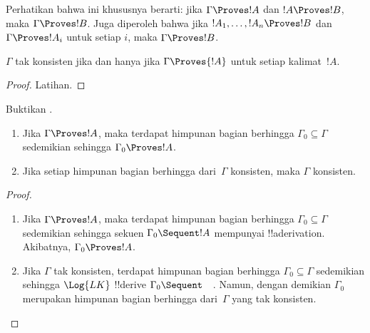 \documentclass[../../../include/open-logic-section]{subfiles}
\begin{document}
Perhatikan bahwa ini khususnya berarti: jika $\Gamma \Proves !A$ dan
$!A \Proves !B$, maka $\Gamma \Proves !B$. Juga diperoleh bahwa jika
$!A_1, \dots, !A_n \Proves !B$ dan $\Gamma \Proves !A_i$ untuk setiap
$i$, maka $\Gamma \Proves !B$.

\begin{prop}
$\Gamma$ tak konsisten jika dan hanya jika $\Gamma \Proves {!A}$ untuk
setiap kalimat~$!A$.
\end{prop}

\begin{proof}
Latihan.
\end{proof}

\begin{prob}
Buktikan .
\end{prob}

\begin{prop}[Kekompakan]
  \begin{enumerate}
  \item Jika $\Gamma \Proves !A$, maka terdapat himpunan bagian berhingga
    $\Gamma_0 \subseteq \Gamma$ sedemikian sehingga
    $\Gamma_0 \Proves !A$.
  \item Jika setiap himpunan bagian berhingga dari~$\Gamma$ konsisten, maka
    $\Gamma$ konsisten.
  \end{enumerate}
\end{prop}

\begin{proof}
  \begin{enumerate}
    \item Jika $\Gamma \Proves !A$, maka terdapat himpunan bagian berhingga
      $\Gamma_0 \subseteq \Gamma$ sedemikian sehingga sekuen
      $\Gamma_0 \Sequent !A$ mempunyai !!a{derivation}. Akibatnya,
      $\Gamma_0 \Proves !A$.
    \item Jika $\Gamma$ tak konsisten, terdapat himpunan bagian berhingga
      $\Gamma_0 \subseteq \Gamma$ sedemikian sehingga $\Log{LK}$
      !!{derive} $\Gamma_0 \Sequent \quad$. Namun, dengan demikian
      $\Gamma_0$ merupakan himpunan bagian berhingga dari~$\Gamma$ yang tak
      konsisten.
  \end{enumerate}
\end{proof}
\end{document}
